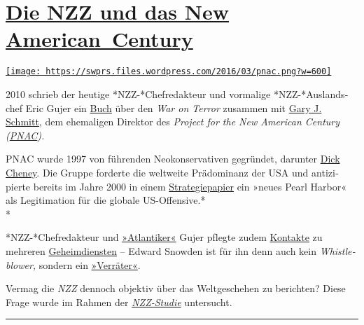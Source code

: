 \hypertarget{die-nzz-und-das-new-american-century}{%
\section{\texorpdfstring{\href{https://swprs.org/2017/03/01/nzz-new-american-century/}{Die
NZZ und das New
American~Century}}{Die NZZ und das New American~Century}}\label{die-nzz-und-das-new-american-century}}

\href{https://swprs.org/2017/03/01/nzz-new-american-century/}{\texttt{[image: https://swprs.files.wordpress.com/2016/03/pnac.png?w=600]}}

2010 schrieb der heutige *NZZ-*Chef­re­dakteur und vor­ma­lige
*NZZ-*Aus­lands­chef Eric Gujer ein
\href{https://www.amazon.com/Safety-Liberty-Islamist-Terrorism-Counterterrorism/dp/084474333X}{Buch}
über den \emph{War on Terror} zu­sammen mit
\href{https://en.wikipedia.org/wiki/Gary_Schmitt}{Gary J. Schmitt}, dem
ehe­ma­li­gen Dir­ektor des \emph{Project for the New American Century
(\href{https://en.wikipedia.org/wiki/Project_for_the_New_American_Century}{PNAC}).}

PNAC wurde 1997 von füh­ren­den Neo­kon­ser­va­ti­ven ge­gründet,
darunter \href{https://de.wikipedia.org/wiki/Dick_Cheney}{Dick Cheney}.
Die Gruppe for­derte die weltweite Prädominanz der USA und
anti­zi­pierte be­reits im Jahre 2000 in ei­nem
\href{https://web.archive.org/web/20130817122719/http://www.newamericancentury.org/RebuildingAmericasDefenses.pdf}{Stra­tegie­­papier}
ein »neues Pearl Harbor« als Legi­ti­ma­tion für die globale
US-Offensive.*\\
*

*NZZ-*Chef­redakteur und
\href{http://bazonline.ch/schweiz/Ein-Atlantiker-an-der-Spitze/story/18216373}{»Atlan­ti­ker«}
Gujer pf‌legte zudem \href{https://www.taz.de/!430263/}{Kon­takte} zu
mehreren
\href{https://web.archive.org/web/20150515195718/http://www.schweizamsonntag.ch/ressort/medien/nzz-chefredaktor_gujer_und_der_geheimdienst/}{Ge­heim­dien­s­ten}
-- Edward Snow­den ist für ihn denn auch kein \emph{Whistle­blower,}
sondern ein
\href{http://www.nzz.ch/schweiz/bern-ist-nicht-bagdad-1.18122326}{»Ver­rä­ter«}.

Vermag die \emph{NZZ} den­noch ob­jek­tiv über das Welt­ge­sche­hen zu
berichten? Diese Frage wur­de im Rah­men der
\emph{\href{https://swprs.org/die-nzz-studie/}{NZZ-Studie}} untersucht.

\begin{center}\rule{0.5\linewidth}{\linethickness}\end{center}

